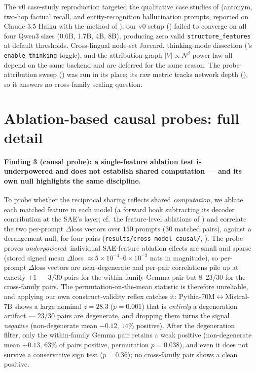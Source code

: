 The v0 case-study reproduction targeted the qualitative case studies of
\citet{lindsey2025biology} (antonym, two-hop factual recall, and entity-recognition hallucination
prompts, reported on Claude 3.5 Haiku with the method of \citet{ameisen2025attribution}); our v0
\circuittracer{} setup () failed to converge on all four Qwen3 sizes (0.6B,
1.7B, 4B, 8B), producing zero valid \texttt{structure\_features} at default thresholds. Cross-lingual node-set Jaccard, thinking-mode dissection (\qwen{}'s
\texttt{enable\_thinking} toggle), and the attribution-graph $|V|\propto N^\beta$ power law
all depend on the same backend and are deferred for the same reason. The probe-attribution
sweep () was run in its place; its raw metric tracks network depth
(), so it answers no cross-family scaling question.

\section{Ablation-based causal probes: full detail}\label{app:causal}

\paragraph{Finding 3 (causal probe): a single-feature ablation test is underpowered and does
not establish shared computation --- and its own null highlights the same discipline.} To
probe whether the reciprocal sharing reflects shared \emph{computation}, we ablate each
matched feature in each model (a forward hook subtracting its decoder contribution at the
SAE's layer; cf.\ the feature-level ablations of \citealp{marks2024sparse}) and correlate
the two per-prompt $\Delta$loss vectors over $150$ prompts
($30$ matched pairs), against a derangement null, for four pairs
(\texttt{results/cross\_model\_causal/}, ). The probe proves
\emph{underpowered}: individual SAE-feature ablation effects are small and sparse (stored signed mean $\Delta$loss
${\approx}5\times10^{-4}$--$6\times10^{-2}$ nats in magnitude), so per-prompt $\Delta$loss vectors are
near-degenerate and per-pair correlations pile up at exactly $\pm1$ --- $3/30$ pairs for the
within-family Gemma pair but $8$--$23/30$ for the cross-family pairs. The
permutation-on-the-mean statistic is therefore unreliable, and applying our own construct-validity
reflex catches it: Pythia-70M$\leftrightarrow$Mistral-7B shows a large nominal $z=28.3$
($p=0.001$) that is \emph{entirely} a degeneration artifact --- $23/30$ pairs are degenerate,
and dropping them turns the signal \emph{negative} (non-degenerate mean $-0.12$, $14\%$
positive). After the degeneration filter, only the within-family Gemma pair retains a weak
positive (non-degenerate mean $+0.13$, $63\%$ of pairs positive, permutation $p=0.038$), and
even it does not survive a conservative sign test ($p=0.36$); no cross-family pair shows a
clean positive.

